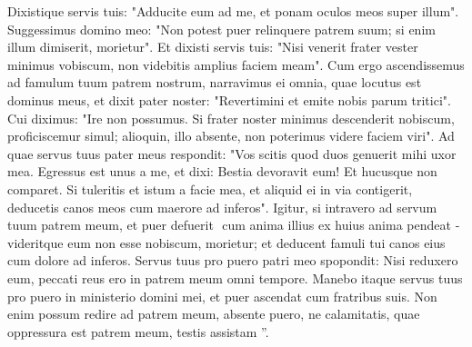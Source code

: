 \begin{biblechapter}
\begin{biblechapter}
\begin{biblechapter}
\begin{biblechapter}
\begin{biblechapter}
\begin{biblechapter}
\begin{biblechapter}
\begin{biblechapter}
\begin{biblechapter}
\begin{biblechapter}
\begin{biblechapter}
\begin{biblechapter}
\begin{biblechapter}
\begin{biblechapter}
\begin{biblechapter}
\begin{biblechapter}
\begin{biblechapter}
\begin{biblechapter}
\begin{biblechapter}
\begin{biblechapter}
\begin{biblechapter}
\begin{biblechapter}
\begin{biblechapter}
\begin{biblechapter}
\begin{biblechapter}
\begin{biblechapter}
\begin{biblechapter}
\begin{biblechapter}
\begin{biblechapter}
\begin{biblechapter}
\begin{biblechapter}
\begin{biblechapter}
\begin{biblechapter}
\begin{biblechapter}
\begin{biblechapter}
\begin{biblechapter}
\begin{biblechapter}
\begin{biblechapter}
\begin{biblechapter}
\begin{biblechapter}
\begin{biblechapter}
\begin{biblechapter}
\begin{biblechapter}
\begin{biblechapter}
\verse Dixistique servis tuis: "Adducite eum ad me, et ponam oculos meos super illum". 
\verse Suggessimus domino meo: "Non potest puer relinquere patrem suum; si enim illum dimiserit, morietur". 
\verse Et dixisti servis tuis: "Nisi venerit frater vester minimus vobiscum, non videbitis amplius faciem meam".
 \verse Cum ergo ascendissemus ad famulum tuum patrem nostrum, narravimus ei omnia, quae locutus est dominus meus, 
\verse et dixit pater noster: "Revertimini et emite nobis parum tritici". 
\verse Cui diximus: "Ire non possumus. Si frater noster minimus descenderit nobiscum, proficiscemur simul; alioquin, illo absente, non poterimus videre faciem viri". 
\verse Ad quae servus tuus pater meus respondit: "Vos scitis quod duos genuerit mihi uxor mea. 
\verse Egressus est unus a me, et dixi: Bestia devoravit eum! Et hucusque non comparet. 
\verse Si tuleritis et istum a facie mea, et aliquid ei in via contigerit, deducetis canos meos cum maerore ad inferos".
 \verse Igitur, si intravero ad servum tuum patrem meum, et puer defuerit ­ cum anima illius ex huius anima pendeat ­ 
\verse videritque eum non esse nobiscum, morietur; et deducent famuli tui canos eius cum dolore ad inferos. 
\verse Servus tuus pro puero patri meo spopondit: Nisi reduxero eum, peccati reus ero in patrem meum omni tempore.
 \verse Manebo itaque servus tuus pro puero in ministerio domini mei, et puer ascendat cum fratribus suis. 
\verse Non enim possum redire ad patrem meum, absente puero, ne calamitatis, quae oppressura est patrem meum, testis assistam ”.
 

\end{biblechapter}
\end{biblechapter}
\end{biblechapter}
\end{biblechapter}
\end{biblechapter}
\end{biblechapter}
\end{biblechapter}
\end{biblechapter}
\end{biblechapter}
\end{biblechapter}
\end{biblechapter}
\end{biblechapter}
\end{biblechapter}
\end{biblechapter}
\end{biblechapter}
\end{biblechapter}
\end{biblechapter}
\end{biblechapter}
\end{biblechapter}
\end{biblechapter}
\end{biblechapter}
\end{biblechapter}
\end{biblechapter}
\end{biblechapter}
\end{biblechapter}
\end{biblechapter}
\end{biblechapter}
\end{biblechapter}
\end{biblechapter}
\end{biblechapter}
\end{biblechapter}
\end{biblechapter}
\end{biblechapter}
\end{biblechapter}
\end{biblechapter}
\end{biblechapter}
\end{biblechapter}
\end{biblechapter}
\end{biblechapter}
\end{biblechapter}
\end{biblechapter}
\end{biblechapter}
\end{biblechapter}
\end{biblechapter}
